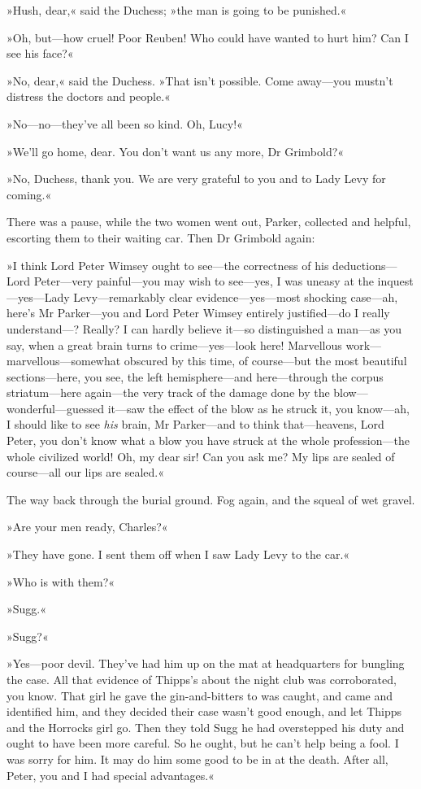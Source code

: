 »Hush, dear,« said the Duchess; »the man is going to be punished.«

»Oh, but—how cruel! Poor Reuben! Who could have wanted to hurt him? Can I see his face?«

»No, dear,« said the Duchess. »That isn't possible. Come away—you mustn't distress the doctors and people.«

»No—no—they've all been so kind. Oh, Lucy!«

»We'll go home, dear. You don't want us any more, Dr Grimbold?«

»No, Duchess, thank you. We are very grateful to you and to Lady Levy for coming.«

There was a pause, while the two women went out, Parker, collected and helpful, escorting them to their waiting car. Then Dr Grimbold again:

»I think Lord Peter Wimsey ought to see—the correctness of his deductions—Lord Peter—very painful—you may wish to see—yes, I was uneasy at the inquest—yes—Lady Levy—remarkably clear evidence—yes—most shocking case—ah, here's Mr Parker—you and Lord Peter Wimsey entirely justified—do I really under\-stand---? Really? I can hardly believe it—so distinguished a man—as you say, when a great brain turns to crime—yes—look here! Marvellous work—marvellous—somewhat obscured by this time, of course—but the most beautiful sections—here, you see, the left hemisphere—and here—through the corpus striatum—here again—the very track of the damage done by the blow—wonderful—guessed it—saw the effect of the blow as he struck it, you know—ah, I should like to see \textit{his} brain, Mr Parker—and to think that—heavens, Lord Peter, you don't know what a blow you have struck at the whole profession—the whole civilized world! Oh, my dear sir! Can you ask me? My lips are sealed of course—all our lips are sealed.«

The way back through the burial ground. Fog again, and the squeal of wet gravel.

»Are your men ready, Charles?«

»They have gone. I sent them off when I saw Lady Levy to the car.«

»Who is with them?«

»Sugg.«

»Sugg?«

»Yes—poor devil. They've had him up on the mat at headquarters for bungling the case. All that evidence of Thipps's about the night club was corroborated, you know. That girl he gave the gin-and-bitters to was caught, and came and identified him, and they decided their case wasn't good enough, and let Thipps and the Horrocks girl go. Then they told Sugg he had overstepped his duty and ought to have been more careful. So he ought, but he can't help being a fool. I was sorry for him. It may do him some good to be in at the death. After all, Peter, you and I had special advantages.«

